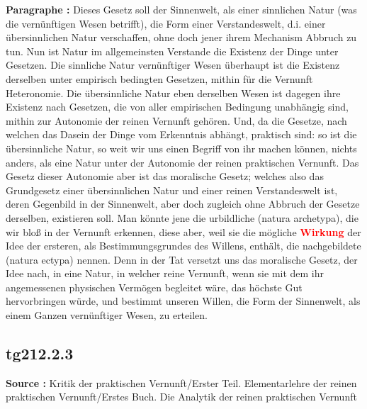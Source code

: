 \documentclass[a4paper,12pt,twoside]{book}
\newcommand{\match}[1]{\textcolor{red}{\textbf{#1}}}
\begin{document}
	\noindent\textbf{Paragraphe : }Dieses Gesetz soll der Sinnenwelt, als einer sinnlichen Natur (was die vernünftigen Wesen betrifft), die Form einer Verstandeswelt, d.i. einer übersinnlichen Natur verschaffen, ohne doch jener ihrem Mechanism Abbruch zu tun. Nun ist Natur im allgemeinsten Verstande die Existenz der Dinge unter Gesetzen. Die sinnliche Natur vernünftiger Wesen überhaupt ist die Existenz derselben unter empirisch bedingten Gesetzen, mithin für die Vernunft Heteronomie. Die übersinnliche Natur eben derselben Wesen ist dagegen ihre Existenz nach Gesetzen, die von aller empirischen Bedingung unabhängig sind, mithin zur Autonomie der reinen Vernunft gehören. Und, da die Gesetze, nach welchen  das Dasein der Dinge vom Erkenntnis abhängt, praktisch sind: so ist die übersinnliche Natur, so weit wir uns einen Begriff von ihr machen können, nichts anders, als eine Natur unter der Autonomie der reinen praktischen Vernunft. Das Gesetz dieser Autonomie aber ist das moralische Gesetz; welches also das Grundgesetz einer übersinnlichen Natur und einer reinen Verstandeswelt ist, deren Gegenbild in der Sinnenwelt, aber doch zugleich ohne Abbruch der Gesetze derselben, existieren soll. Man könnte jene die urbildliche (natura archetypa), die wir bloß in der Vernunft erkennen, diese aber, weil sie die mögliche \match{Wirkung} der Idee der ersteren, als Bestimmungsgrundes des Willens, enthält, die nachgebildete (natura ectypa) nennen. Denn in der Tat versetzt uns das moralische Gesetz, der Idee nach, in eine Natur, in welcher reine Vernunft, wenn sie mit dem ihr angemessenen physischen Vermögen begleitet wäre, das höchste Gut hervorbringen würde, und bestimmt unseren Willen, die Form der Sinnenwelt, als einem Ganzen vernünftiger Wesen, zu erteilen. 
	
	\subsection*{tg212.2.3} 
	\textbf{Source : }Kritik der praktischen Vernunft/Erster Teil. Elementarlehre der reinen praktischen Vernunft/Erstes Buch. Die Analytik der reinen praktischen Vernunft\\  
	
\end{document}
